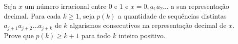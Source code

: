 Seja $x$ um número irracional entre $0$ e $1$ e $x=0,a_1a_2\dots$ a sua representação decimal.
Para cada $k \ge 1$, seja $p(k)$ a quantidade de sequências distintas $a_{j+1}a_{j+2}\dots a_{j+k}$ de $k$ algarismos consecutivos na representação decimal de $x$.
Prove que $p(k)\ge k+1$ para todo $k$ inteiro positivo.